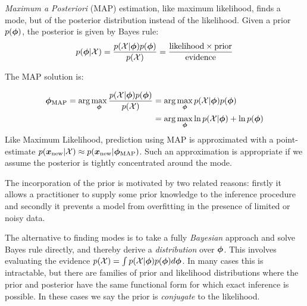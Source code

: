 \emph{Maximum a Posteriori} (MAP) estimation, like maximum likelihood, finds a mode, but of the posterior distribution instead of the likelihood. Given a prior $p({ \bm \phi })$, the posterior is given by Bayes rule:
\begin{align}
p({ \bm \phi } | { \mathcal{X} }) = \frac{p({ \mathcal{X} } | { \bm \phi })p({ \bm \phi })}{p({ \mathcal{X} })} = \frac{\text{likelihood} \times \text{prior}}{\text{evidence}}
\end{align}

The MAP solution is:

\begin{align}
{ { {  \bm \phi  } }_{\text{MAP}} } = \arg \max_{{ \bm \phi }} \frac{p({ \mathcal{X} } | { \bm \phi })p({ \bm \phi })}{p({ \mathcal{X} })}
 & = \arg \max_{{ \bm \phi }} p({ \mathcal{X} } | { \bm \phi })p({ \bm \phi }) \\
 & = \arg \max_{ \bm \phi } \ln p({ \mathcal{X} } | { \bm \phi }) + \ln p({ \bm \phi })
\end{align}
Like Maximum Likelihood, prediction using MAP is approximated with a point-estimate $p({ \bm x_{\text{new}} } | { \mathcal{X} }) \approx p({ \bm x_{\text{new}} } | { {{ \bm \phi }}_{\text{MAP}} })$. Such an approximation is appropriate if we assume the posterior is tightly concentrated around the mode.

The incorporation of the prior is motivated by two related reasons: firstly it allows a practitioner to supply some prior knowledge to the inference procedure and secondly it prevents a model from overfitting in the presence of limited or noisy data.

The alternative to finding modes is to take a fully \emph{Bayesian} approach and solve Bayes rule directly, and thereby derive a \emph{distribution} over ${ \bm \phi }$. This involves evaluating the evidence $p({ \mathcal{X} }) = \int p({ \mathcal{X} } | { \bm \phi }) p({ \bm \phi }) d{ \bm \phi }$. In many cases this is intractable, but there are families of prior and likelihood distributions where the prior and posterior have the same functional form for which exact inference is possible. In these cases we say the prior is \emph{conjugate} to the likelihood.

